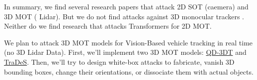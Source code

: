 In summary, we find several research papers that attack 2D SOT (caemera) and 3D MOT ( Lidar). But we do not find attacks against 3D monocular trackers \citep{wu2021track} \citep{hu2022monocular}. Neither do we find research that attacks Transformers for 2D MOT.

We plan to attack 3D MOT models for Vision-Based vehicle tracking in real time (no 3D Lidar Data). First, we'll implement two 3D MOT models: \href{https://github.com/SysCV/qd-3dt}{QD-3DT} and \href{https://github.com/JialianW/TraDeS}{TraDeS}. Then, we'll try to design white-box attacks to fabricate, vanish 3D bounding boxes, change their orientations, or dissociate them with actual objects.





